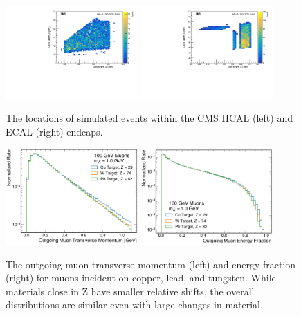 \begin{figure}[ht]
	\includegraphics[width=0.45\textwidth]{figures/HCALbrems.pdf}
	\centering
	\hspace{0.01\textwidth}
	\includegraphics[width=0.45\textwidth]{figures/ECALbrems.pdf}
	\caption[Simulated \dbrem Locations]{The locations of simulated \dbrem events within the CMS HCAL (left) and ECAL (right) endcaps.}
	\label{fig:HEbrems}
\end{figure}

\begin{figure}[!htbp]
    \centering
    \includegraphics[width=0.45\textwidth]{figures/muon_material_comp_pt.pdf}
    \hspace{0.01\textwidth}
    \includegraphics[width=0.45\textwidth]{figures/muon_material_comp_efrac.pdf}
    \caption[
        Material dependence of \dbrem kinematics.
    ]{
        The outgoing muon transverse momentum (left) and energy fraction (right) for muons incident on copper, lead, and tungsten. While materials close in Z have smaller relative shifts, the overall distributions are similar even with large changes in material. 
    }
    \label{fig:dbrem_material}
\end{figure}

